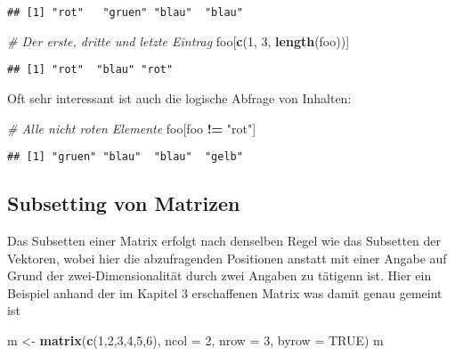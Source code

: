 \documentclass[
]{book}
\newenvironment{Shaded}{\begin{snugshade}}{\end{snugshade}}
\newcommand{\CommentTok}[1]{\textcolor[rgb]{0.56,0.35,0.01}{\textit{#1}}}
\newcommand{\DataTypeTok}[1]{\textcolor[rgb]{0.13,0.29,0.53}{#1}}
\newcommand{\DecValTok}[1]{\textcolor[rgb]{0.00,0.00,0.81}{#1}}
\newcommand{\KeywordTok}[1]{\textcolor[rgb]{0.13,0.29,0.53}{\textbf{#1}}}
\newcommand{\NormalTok}[1]{#1}
\newcommand{\OperatorTok}[1]{\textcolor[rgb]{0.81,0.36,0.00}{\textbf{#1}}}
\newcommand{\OtherTok}[1]{\textcolor[rgb]{0.56,0.35,0.01}{#1}}
\newcommand{\StringTok}[1]{\textcolor[rgb]{0.31,0.60,0.02}{#1}}
\begin{document}
\begin{verbatim}
## [1] "rot"   "gruen" "blau"  "blau"
\end{verbatim}

\begin{Shaded}
\begin{Highlighting}[]
\CommentTok{# Der erste, dritte und letzte Eintrag}
\NormalTok{foo[}\KeywordTok{c}\NormalTok{(}\DecValTok{1}\NormalTok{, }\DecValTok{3}\NormalTok{, }\KeywordTok{length}\NormalTok{(foo))]}
\end{Highlighting}
\end{Shaded}

\begin{verbatim}
## [1] "rot"  "blau" "rot"
\end{verbatim}

Oft sehr interessant ist auch die logische Abfrage von Inhalten:

\begin{Shaded}
\begin{Highlighting}[]
\CommentTok{# Alle nicht roten Elemente}
\NormalTok{foo[foo }\OperatorTok{!=}\StringTok{ "rot"}\NormalTok{]}
\end{Highlighting}
\end{Shaded}

\begin{verbatim}
## [1] "gruen" "blau"  "blau"  "gelb"
\end{verbatim}

\hypertarget{subsetting-von-matrizen}{%
\subsection{Subsetting von Matrizen}\label{subsetting-von-matrizen}}

Das Subsetten einer Matrix erfolgt nach denselben Regel wie das Subsetten der Vektoren, wobei hier die abzufragenden
Positionen anstatt mit einer Angabe auf Grund der zwei-Dimensionalität durch zwei Angaben
zu tätigenn ist. Hier ein Beispiel anhand der im Kapitel 3 erschaffenen Matrix was damit genau gemeint ist

\begin{Shaded}
\begin{Highlighting}[]
\NormalTok{m <-}\StringTok{ }\KeywordTok{matrix}\NormalTok{(}\KeywordTok{c}\NormalTok{(}\DecValTok{1}\NormalTok{,}\DecValTok{2}\NormalTok{,}\DecValTok{3}\NormalTok{,}\DecValTok{4}\NormalTok{,}\DecValTok{5}\NormalTok{,}\DecValTok{6}\NormalTok{), }\DataTypeTok{ncol =} \DecValTok{2}\NormalTok{, }\DataTypeTok{nrow =} \DecValTok{3}\NormalTok{, }\DataTypeTok{byrow =} \OtherTok{TRUE}\NormalTok{)}
\NormalTok{m}
\end{Highlighting}
\end{Shaded}
\end{document}
